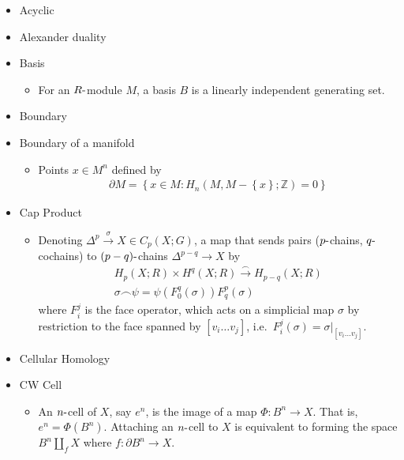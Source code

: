 \begin{itemize}
\item
  Acyclic
\item
  Alexander duality
\item
  Basis

  \begin{itemize}
  \tightlist
  \item
    For an \(R{\hbox{-}}\)module \(M\), a basis \(B\) is a linearly
    independent generating set.
  \end{itemize}
\item
  Boundary
\item
  Boundary of a manifold

  \begin{itemize}
  \tightlist
  \item
    Points \(x\in M^n\) defined by
    \begin{align*}
      {\partial}M = \left\{{x\in M: H_n(M, M-\left\{{x}\right\}; {\mathbb{Z}}) = 0}\right\}
      \end{align*}
  \end{itemize}
\item
  Cap Product

  \begin{itemize}
  \tightlist
  \item
    Denoting \(\Delta^p \xrightarrow{\sigma} X \in C_p(X; G)\), a map
    that sends pairs (\(p{\hbox{-}}\)chains, \(q{\hbox{-}}\)cochains) to
    \((p-q){\hbox{-}}\)chains \(\Delta^{p-q} \to X\) by
    \begin{align*}
      H_p(X; R)\times H^q(X; R) \xrightarrow{\frown} H_{p-q}(X; R)\\
      \sigma \frown \psi = \psi(F_0^q(\sigma))F_q^p(\sigma)
      \end{align*}
    where \(F_i^j\) is the face operator, which acts on a simplicial map
    \(\sigma\) by restriction to the face spanned by
    \([v_i \ldots v_j]\),
    i.e.~\(F_i^j(\sigma) = {\left.{{\sigma}} \right|_{{[v_i \ldots v_j]}} }\).
  \end{itemize}
\item
  Cellular Homology
\item
  CW Cell

  \begin{itemize}
  \tightlist
  \item
    An \(n{\hbox{-}}\)cell of \(X\), say \(e^n\), is the image of a map
    \(\Phi: B^n \to X\). That is, \(e^n = \Phi(B^n)\). Attaching an
    \(n{\hbox{-}}\)cell to \(X\) is equivalent to forming the space
    \(B^n \coprod_f X\) where \(f: {\partial}B^n \to X\).


\end{itemize}
\end{itemize}
